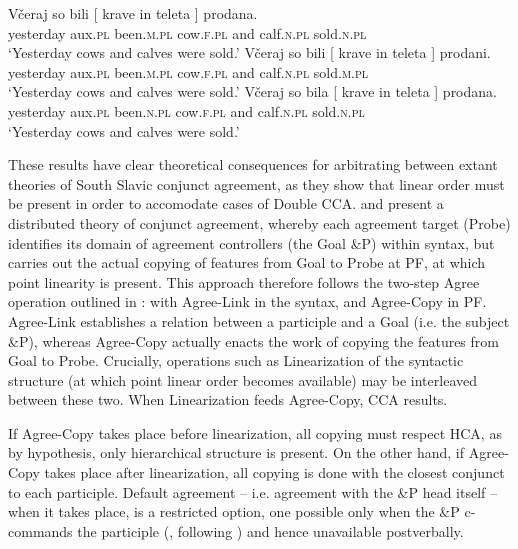 \documentclass[output=paper
,modfonts
,nonflat]{langsci/langscibook}
\begin{document}
\begin{exe} 
\ex
\begin{xlist}
\ex \gll *Včeraj      so    bili       [ krave    in    teleta ]    prodana.\\
yesterday aux.\textsc{pl} been.\textsc{m.pl} {} cow.\textsc{f.pl} and calf.\textsc{n.pl} {}   sold.\textsc{n.pl} \\
\glt `Yesterday cows and calves were sold.' 
\ex \gll *Včeraj      so    bili       [ krave    in    teleta ]    prodani.\\
yesterday aux.\textsc{pl} been.\textsc{m.pl} {} cow.\textsc{f.pl} and calf.\textsc{n.pl} {}   sold.\textsc{m.pl} \\
\glt `Yesterday cows and calves were sold.' 
\ex \gll *Včeraj      so    bila       [ krave    in    teleta ]    prodana.\\
yesterday aux.\textsc{pl} been.\textsc{n.pl} {} cow.\textsc{f.pl} and calf.\textsc{n.pl} {}   sold.\textsc{n.pl} \\
\glt `Yesterday cows and calves were sold.' 
\end{xlist}
\end{exe}
These results have clear theoretical consequences for arbitrating between extant theories of South Slavic conjunct agreement, as they show that linear order must be present in order to accomodate cases of Double CCA. \cite{marusicnevinsbadecker:15} and \cite{willergold:16} present a distributed theory of conjunct agreement, whereby each agreement target (Probe) identifies its domain of agreement controllers (the Goal \&P) within syntax, but carries out the actual copying of features from Goal to Probe at PF, at which point linearity is present. This approach therefore follows the two-step Agree operation outlined in  \citet{arregi-nevins:12}: with Agree-Link in the syntax, and Agree-Copy in PF. Agree-Link establishes a relation between a participle and a Goal (i.e. the subject \&P), whereas Agree-Copy actually enacts the work of copying the features from Goal to Probe. Crucially, operations such as Linearization of the syntactic structure (at which point linear order becomes available) may be interleaved between these two. When Linearization feeds Agree-Copy, CCA results. 

If Agree-Copy takes place before linearization, all copying must respect HCA, as by hypothesis, only hierarchical structure is present. On the other hand, if Agree-Copy takes place after linearization, all copying is done with the closest conjunct to each participle. Default agreement -- i.e. agreement with the \&P head itself --  when it takes place, is a restricted option, one possible only when the \&P c-commands the participle (\citealt{willergold:16}, following \citealt{smith:17a}) and hence unavailable postverbally.
\end{document}
